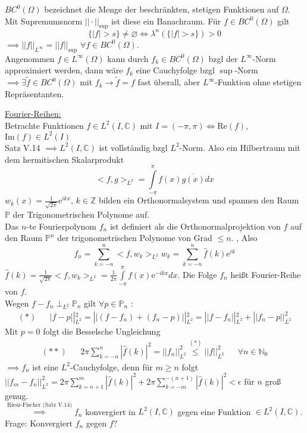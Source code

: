   \begin{remark}
    $BC^0(\Omega)$ bezeichnet die Menge der beschränkten, stetigen Funktionen auf $\Omega$. Mit Supremumsnorm $||\cdot||_{\sup}$ ist diese ein Banachraum. Für $f\in  BC^0(\Omega)$ gilt \\
    $$\{ |f|>s \} \neq \varnothing \Leftrightarrow \lambda^n(\{ |f|>s \}) > 0$$
    $\implies ||f||_{L^\infty} = ||f||_{\sup}$ $\forall f\in BC^0(\Omega)$. \\
    Angenommen $f\in L^\infty(\Omega)$ kann durch $f_k \in BC^0(\Omega)$ bzgl der $L^\infty$-Norm approximiert werden, dann wäre $f_k$ eine Cauchyfolge bzgl $\sup$-Norm \\
    $\implies \exists \tilde{f} \in BC^0(\Omega)$ mit $f_k\to \tilde{f}=f$ fast überall, aber $L^\infty$-Funktion ohne stetigen Repräsentanten.
    \item[] \underline{Fourier-Reihen:} \\
    Betrachte Funktionen $f\in L^2(I,\mathbb{C})$ mit $I =(-\pi, \pi) \Leftrightarrow \text{Re}(f)$, $\text{Im}(f) \in L^2(I)$ \\
    Satz V.14 $\implies L^2(I,\mathbb{C})$ ist vollständig bzgl $L^2$-Norm. Also ein Hilbertraum mit dem hermitischen Skalarprodukt $$<f,g>_{L^2} = \int\limits_{-\pi}^\pi f(x) \overline{g(x)}dx$$
    $w_k (x) = \frac{1}{\sqrt{2\pi}} \text{e}^{ikx}$, $k\in\mathbb{Z}$ bilden ein Orthonormalsystem und spannen den Raum $\mathbb{P}$ der Trigonometrischen Polynome auf. \\
    Das $n$-te Fourierpolynom $f_n$ ist definiert als die Orthonormalprojektion von $f$ auf den Raum $\mathbb{P}^n$ der trigonometrischen Polynome von Grad $\leq n$. , Also\\
    $$ f_n = \sum\limits_{k=-n}^n <f,w_k>_{L^2} w_k = \sum\limits_{k=-n}^n \hat{f}(k) \text{e}^{ik}$$
    $\hat{f}(k) = \frac{1}{\sqrt{2\pi}} <f,w_k>_{L^2} = \frac{1}{2\pi} \int\limits_{-\pi}^\pi f(x) \text{e}^{-ikx} dx$. Die Folge $f_n$ heißt Fourier-Reihe von $f$. \\
    Wegen $f-f_n \perp_{L^2} \mathbb{P}_n$ gilt $\forall p\in \mathbb{P}_n$ : \\
    \begin{align*}
    (\ast) & & |f-p||_{L^2}^2 = ||(f-f_n)+(f_n-p) ||_{L^2}^2 = ||f-f_n||_{L^2}^2 + ||f_n-p||_{L^2}^2
    \end{align*}
	Mit $p = 0$ folgt die Besselsche Ungleichung 
	\begin{align*}
	(\ast\ast) & & 2\pi \sum\limits_{k=-n}^n |\hat{f}(k)|^2 = ||f_n||^2_{L^2} \overset{(\ast)}{\leq} ||f||_{L^2}^2 & &  \forall n\in\mathbb{N}_0
	\end{align*}
	$\implies f_n$ ist eine $L^2$-Cauchyfolge, denn für $m\geq n$ folgt \\  $||f_m-f_n||^2_{L^2} = 2\pi \sum\limits_{k=n+1}^m |\hat{f}(k) |^2 + 2\pi \sum\limits_{k=-m}^{-(n+1)} |\hat{f}(k)|^2 < \epsilon$ für $n$ groß genug. \\
	$\overset{\text{Riesz-Fischer (Satz V.14)}}{\implies} f_n$ konvergiert in $L^2(I,\mathbb{C})$ gegen  eine Funktion $\in L^2(I, \mathbb{C})$. \\
	Frage: Konvergiert $f_n$ gegen $f$?
	
  \end{remark}

